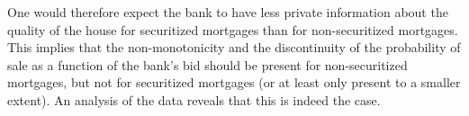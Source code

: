 \documentclass[11pt,twopage]{article}
\begin{document}

One would therefore expect the bank to have less private information
about the quality of the house for securitized mortgages than for
non-securitized mortgages. This implies that the non-monotonicity and
the discontinuity of the probability of sale as a function of the
bank's bid should be present for non-securitized mortgages, but not
for securitized mortgages (or at least only present to a smaller
extent). An analysis of the data reveals that this is indeed the case.
\end{document}
